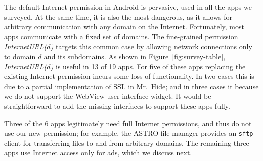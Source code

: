 \documentclass[preprint]{sig-alternate-10pt}
\newcommand{\code}[1]{\textsf{#1}}
\newcommand{\lib}{Mr.\ Hide\xspace}
\newcommand{\perm}[1]{\textsf{\textit{#1}}}
\newcommand{\comment}[3][\color{red}]{}%
\newcommand{\tdm}[1]{\comment[\color{red}]{TDM}{#1}}
\newcommand{\jeff}[1]{\comment[\color{green}]{JSF}{#1}}
\newcommand{\kris}[1]{\comment[\color{orange}]{KM}{#1}}
\newcommand{\polInternetUrlName}[1]{\perm{InternetURL(}{#1}\perm{)}\xspace}
\begin{document}
The default Internet permission in
Android is pervasive, used in all the apps we surveyed.  At the
same time, it is also the most dangerous, as it allows for arbitrary
communication with any domain on the Internet.
Fortunately, most
apps communicate with a fixed set of domains.  
The  fine-grained permission \polInternetUrlName{$d$} targets this
common case by 
allowing network connections only to domain $d$ and its subdomains.
As shown in Figure~\ref{fig:survey-table}, \polInternetUrlName{$d$}
is useful in 13 of 19 apps.  For five of these apps replacing
the existing Internet permission incurs some loss of functionality.
In two cases this is due to a partial implementation of SSL in \lib;
and in three cases it because we do not support the \code{WebView}
user-interface widget.
It would be straightforward to add the missing %
interfaces to support these apps fully.

Three of the 6 apps legitimately need full Internet permissions, and
thus do not use our new permission; for example, the ASTRO
file manager provides an {\tt sftp} client for transferring files to
and from arbitrary domains.
The remaining three apps use Internet
access only for ads, which we 
discuss next.

\end{document}
